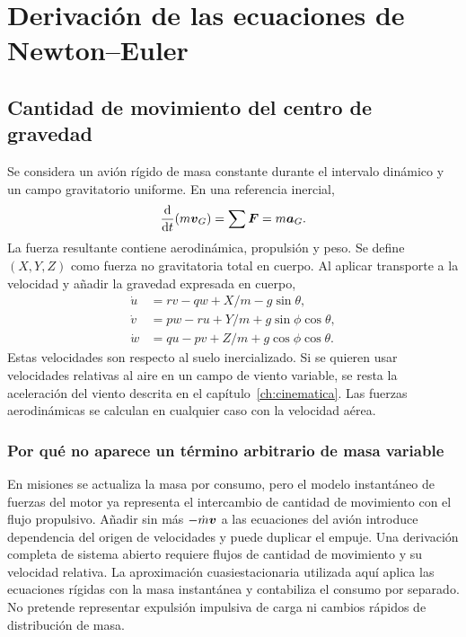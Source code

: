 \chapter{Derivación de las ecuaciones de Newton--Euler}\label{ch:eom}

\section{Cantidad de movimiento del centro de gravedad}
Se considera un avión rígido de masa constante durante el intervalo dinámico y un campo gravitatorio uniforme. En una referencia inercial,
\begin{equation}
\frac{\mathrm{d}}{\mathrm{d} t}(m\boldsymbol{v}_G)=\sum\boldsymbol{F}=m\boldsymbol{a}_G.
\end{equation}
La fuerza resultante contiene aerodinámica, propulsión y peso. Se define $(X,Y,Z)$ como fuerza no gravitatoria total en cuerpo. Al aplicar transporte a la velocidad y añadir la gravedad expresada en cuerpo,
\begin{align}
\dot u&=rv-qw+X/m-g\sin\theta,\\
\dot v&=pw-ru+Y/m+g\sin\phi\cos\theta,\\
\dot w&=qu-pv+Z/m+g\cos\phi\cos\theta.
\label{eq:traslacionales}
\end{align}
Estas velocidades son respecto al suelo inercializado. Si se quieren usar velocidades relativas al aire en un campo de viento variable, se resta la aceleración del viento descrita en el capítulo~\ref{ch:cinematica}. Las fuerzas aerodinámicas se calculan en cualquier caso con la velocidad aérea.

\subsection{Por qué no aparece un término arbitrario de masa variable}
En misiones se actualiza la masa por consumo, pero el modelo instantáneo de fuerzas del motor ya representa el intercambio de cantidad de movimiento con el flujo propulsivo. Añadir sin más $-\dot m\boldsymbol{v}$ a las ecuaciones del avión introduce dependencia del origen de velocidades y puede duplicar el empuje. Una derivación completa de sistema abierto requiere flujos de cantidad de movimiento y su velocidad relativa. La aproximación cuasiestacionaria utilizada aquí aplica las ecuaciones rígidas con la masa instantánea y contabiliza el consumo por separado. No pretende representar expulsión impulsiva de carga ni cambios rápidos de distribución de masa.

